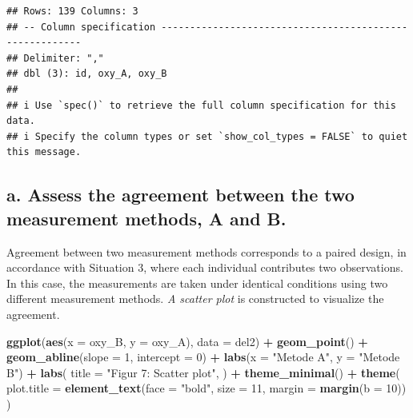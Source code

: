 \documentclass[
]{article}
\newenvironment{Shaded}{\begin{snugshade}}{\end{snugshade}}
\newcommand{\AttributeTok}[1]{\textcolor[rgb]{0.13,0.29,0.53}{#1}}
\newcommand{\DecValTok}[1]{\textcolor[rgb]{0.00,0.00,0.81}{#1}}
\newcommand{\FunctionTok}[1]{\textcolor[rgb]{0.13,0.29,0.53}{\textbf{#1}}}
\newcommand{\NormalTok}[1]{#1}
\newcommand{\SpecialCharTok}[1]{\textcolor[rgb]{0.81,0.36,0.00}{\textbf{#1}}}
\newcommand{\StringTok}[1]{\textcolor[rgb]{0.31,0.60,0.02}{#1}}
\begin{document}
\begin{verbatim}
## Rows: 139 Columns: 3
## -- Column specification --------------------------------------------------------
## Delimiter: ","
## dbl (3): id, oxy_A, oxy_B
## 
## i Use `spec()` to retrieve the full column specification for this data.
## i Specify the column types or set `show_col_types = FALSE` to quiet this message.
\end{verbatim}

\subsection{a. Assess the agreement between the two measurement methods,
A and
B.}\label{a.-assess-the-agreement-between-the-two-measurement-methods-a-and-b.}

Agreement between two measurement methods corresponds to a paired
design, in accordance with Situation 3, where each individual
contributes two observations. In this case, the measurements are taken
under identical conditions using two different measurement methods.
\emph{A scatter plot} is constructed to visualize the agreement.

\begin{Shaded}
\begin{Highlighting}[]
\FunctionTok{ggplot}\NormalTok{(}\FunctionTok{aes}\NormalTok{(}\AttributeTok{x =}\NormalTok{ oxy\_B, }\AttributeTok{y =}\NormalTok{ oxy\_A), }\AttributeTok{data =}\NormalTok{ del2) }\SpecialCharTok{+}
  \FunctionTok{geom\_point}\NormalTok{() }\SpecialCharTok{+}
  \FunctionTok{geom\_abline}\NormalTok{(}\AttributeTok{slope =} \DecValTok{1}\NormalTok{, }\AttributeTok{intercept =} \DecValTok{0}\NormalTok{) }\SpecialCharTok{+}
  \FunctionTok{labs}\NormalTok{(}\AttributeTok{x =} \StringTok{"Metode A"}\NormalTok{, }\AttributeTok{y =} \StringTok{"Metode B"}\NormalTok{) }\SpecialCharTok{+}
  \FunctionTok{labs}\NormalTok{(}
    \AttributeTok{title =} \StringTok{"Figur 7: Scatter plot"}\NormalTok{,}
\NormalTok{  ) }\SpecialCharTok{+}
  \FunctionTok{theme\_minimal}\NormalTok{() }\SpecialCharTok{+}
  \FunctionTok{theme}\NormalTok{(}
    \AttributeTok{plot.title =} \FunctionTok{element\_text}\NormalTok{(}\AttributeTok{face =} \StringTok{"bold"}\NormalTok{, }\AttributeTok{size =} \DecValTok{11}\NormalTok{, }\AttributeTok{margin =} \FunctionTok{margin}\NormalTok{(}\AttributeTok{b =} \DecValTok{10}\NormalTok{))}
\NormalTok{  )}
\end{Highlighting}
\end{Shaded}
\end{document}
